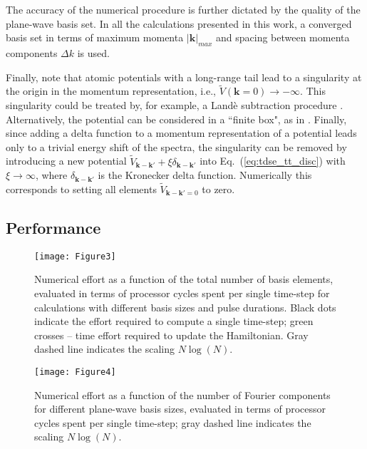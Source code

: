 \documentclass[
pra%
,preprint%
,amssymb, nobibnotes, aps, superscriptaddress, floatfix]{revtex4}
\newcommand{\kv}{\mathbf{k}}
\newcommand{\Vt}{\widetilde{V}}
\newcommand{\dk}{\Delta k}
\newcommand{\Vidx}[1]{\Vt_{#1}}
\newcommand{\Vdkp}{\Vidx{\kv-\kv'}}
\begin{document}
The accuracy of the numerical procedure is further dictated by the quality of the plane-wave basis set. In all the calculations presented in this work, a converged basis set in terms of maximum momenta $|\kv|_{max}$ and spacing between momenta components $\dk$ is used. %

Finally, note that atomic potentials with a long-range tail lead to a singularity at the origin in the momentum representation, i.e., $\Vt(\kv=0) \rightarrow -\infty$. This singularity could be treated by, for example, a Land\`{e} subtraction  procedure \cite{Norbury1994,Shvetsov-Shilovski2014}. Alternatively, the potential can be considered in a ``finite box", as in \cite{Jiang2008}. Finally, since adding a delta function to a momentum representation of a potential leads only to a trivial energy shift of the spectra, the singularity can be removed by introducing a new potential $\Vdkp + \xi \delta_{\kv-\kv'}$ into Eq.~(\ref{eq:tdse_tt_disc}) with $\xi \rightarrow \infty$, where $\delta_{\kv-\kv'}$ is the Kronecker delta function. Numerically this corresponds to setting all elements  $ \Vidx{\kv-\kv'=0}$ to zero.

\subsection{Performance}

\begin{figure}
	\centering
	\texttt{[image: Figure3]}
	\caption{Numerical effort as a function of the total number of basis elements, evaluated in terms of processor cycles spent per single time-step for calculations with different basis sizes and pulse durations. Black dots indicate the effort required to compute a single time-step; green crosses -- time effort required to update the Hamiltonian. Gray dashed line indicates the scaling $N\log(N)$.}
	\label{fig:scaling_element_number}
\end{figure}


\begin{figure}
\centering
\texttt{[image: Figure4]}
\caption{Numerical effort as a function of the number of Fourier components for different plane-wave basis sizes, evaluated in terms of processor cycles spent per single time-step; gray dashed line indicates the scaling $N\log(N)$.}
\label{fig:scaling_basis_size}
\end{figure}
\end{document}
